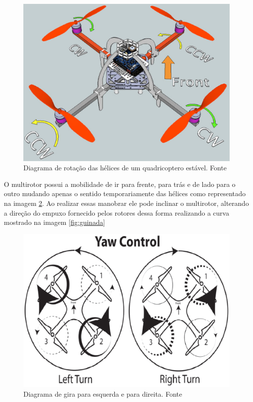 \begin{figure}[H]
    \centering
      \includegraphics[keepaspectratio=true,scale=0.5]{figuras/rotacao.eps}
    \caption{Diagrama  de rotação das hélices de um quadricoptero estável. Fonte \cite{audronis}}
    \label{fig:gira}
\end{figure}

O multirotor possui a mobilidade de ir para frente, para trás e de lado para o outro mudando apenas o sentido temporariamente das hélices como representado na imagem \ref{fig:gira}. Ao realizar essas manobrar ele pode inclinar o multirotor, alterando a direção do empuxo fornecido pelos rotores dessa forma realizando a curva mostrado na imagem \ref{fig:guinada}

\begin{figure}[H]
    \centering
      \includegraphics[keepaspectratio=true,scale=0.5]{figuras/gira.eps}
    \caption{Diagrama de gira para esquerda e para direita. Fonte \cite{audronis}}
    \label{fig:gira}
\end{figure}

